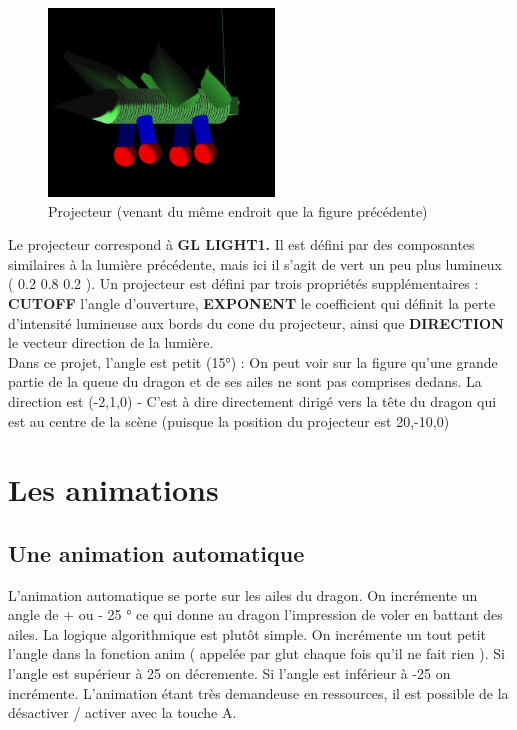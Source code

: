 \documentclass{article}
\begin{document}
\begin{figure}[!htb]
	\centering
    	\includegraphics[height=5cm]{./assets/projecteur.jpg}
    	\caption{Projecteur (venant du même endroit que la figure précédente)}
    	\label{fig:projecteur}
\end{figure}
\newpage
Le projecteur correspond à \textbf{GL LIGHT1.}
Il est défini par des composantes similaires à la lumière précédente, mais ici il s'agit de vert un peu plus lumineux ( 0.2 0.8 0.2 ).
Un projecteur est défini par trois propriétés supplémentaires : \textbf{CUTOFF} l'angle d'ouverture, \textbf{EXPONENT} le coefficient qui définit la perte d'intensité lumineuse aux bords du cone du projecteur, ainsi que \textbf{DIRECTION} le vecteur direction de la lumière.\\

Dans ce projet, l'angle est petit (15°) : On peut voir sur la figure qu'une grande partie de la queue du dragon et de ses ailes ne sont pas comprises dedans. La direction est (-2,1,0) - C'est à dire directement dirigé vers la tête du dragon qui est au centre de la scène (puisque la position du projecteur est 20,-10,0)


\section{Les animations}

\subsection{Une animation automatique}

L'animation automatique se porte sur les ailes du dragon. On incrémente un angle de + ou - 25 ° ce qui donne au dragon l'impression de voler en battant des ailes. La logique algorithmique est plutôt simple. On incrémente un tout petit l'angle dans la fonction anim ( appelée par glut chaque fois qu'il ne fait rien ). Si l'angle est supérieur à 25 on décremente. Si l'angle est inférieur à -25 on incrémente. 
\newline
\newline
L'animation étant très demandeuse en ressources, il est possible de la désactiver / activer avec la touche A.
\end{document}
